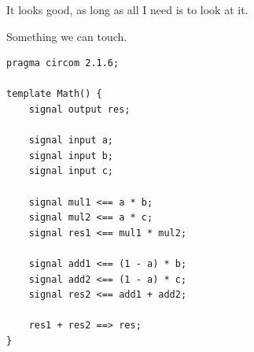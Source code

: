 \documentclass{zkdl-presentation-template}
\begin{document}
\begin{frame}{It looks good, as long as all I need is to look at it.}
\begin{center}
        \end{center}
    \end{frame}

    \begin{frame}[fragile]{Something we can touch.}
        \begin{lstlisting}[language=Circom,numbers=none,label={lst:lstlisting1}]
pragma circom 2.1.6;

template Math() {
    signal output res;

    signal input a;
    signal input b;
    signal input c;

    signal mul1 <== a * b;
    signal mul2 <== a * c;
    signal res1 <== mul1 * mul2;

    signal add1 <== (1 - a) * b;
    signal add2 <== (1 - a) * c;
    signal res2 <== add1 + add2;

    res1 + res2 ==> res;
}
        \end{lstlisting}
    \end{frame}
\end{document}
